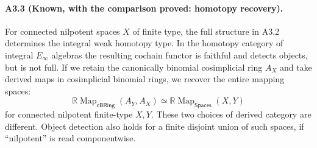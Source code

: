 \paragraph{A3.3 (Known, with the comparison proved: homotopy recovery).}
\label{A3.3}
For connected nilpotent spaces $X$ of finite type, the full structure
in A3.2 determines the integral weak homotopy type. In the homotopy
category of integral $E_\infty$ algebras the resulting cochain functor
is faithful and detects objects, but is not full. If we retain the
canonically binomial cosimplicial ring $A_X$ and take derived maps in
cosimplicial binomial rings, we recover the entire mapping spaces:
\[
 \mathbb R\operatorname{Map}_{\mathsf{cBRing}}(A_Y,A_X)
 \simeq\mathbb R\operatorname{Map}_{\mathsf{Spaces}}(X,Y)
\]
for connected nilpotent finite-type $X,Y$. These two choices of derived
category are different. Object detection also holds for a finite
disjoint union of such spaces, if ``nilpotent'' is read componentwise.

